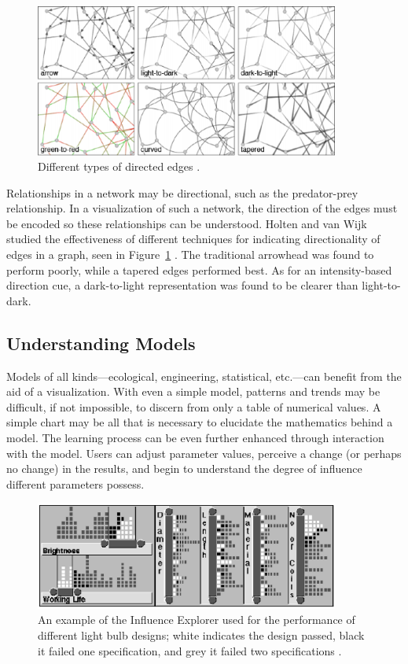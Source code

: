 \documentclass{article}
\begin{document}
\begin{figure}[h]
	\centering
	\includegraphics[width=10cm]{figures/directedEdges.eps}
	\caption{Different types of directed edges \cite{Holten:2009:USV:1518701.1519054}.}
	\label{fig:directedEdges}
\end{figure}

Relationships in a network may be directional, such as the predator-prey relationship.  In a visualization of such a network, the direction of the edges must be encoded so these relationships can be understood.  Holten and van Wijk studied the effectiveness of different techniques for indicating directionality of edges in a graph, seen in Figure~\ref{fig:directedEdges} \cite{Holten:2009:USV:1518701.1519054}.  The traditional arrowhead was found to perform poorly, while a tapered edges performed best.  As for an intensity-based direction cue, a dark-to-light representation was found to be clearer than light-to-dark.

\subsection{Understanding Models}

Models of all kinds---ecological, engineering, statistical, etc.---can benefit from the aid of a visualization.  With even a simple model, patterns and trends may be difficult, if not impossible, to discern from only a table of numerical values.  A simple chart may be all that is necessary to elucidate the mathematics behind a model.  The learning process can be even further enhanced through interaction with the model.  Users can adjust parameter values, perceive a change (or perhaps no change) in the results, and begin to understand the degree of influence different parameters possess.

\begin{figure}[h]
	\centering
	\includegraphics[width=10cm]{figures/influenceExplorer.eps}
	\caption{An example of the Influence Explorer used for the performance of different light bulb designs; white indicates the design passed, black it failed one specification, and grey it failed two specifications \cite{conf/chi/TweedieSDS95}.}
	\label{fig:influenceExplorer}
\end{figure}
\end{document}

